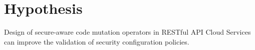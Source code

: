 \section{Hypothesis}

Design of secure-aware code mutation operators in RESTful API Cloud Services can improve the validation of security configuration policies.
